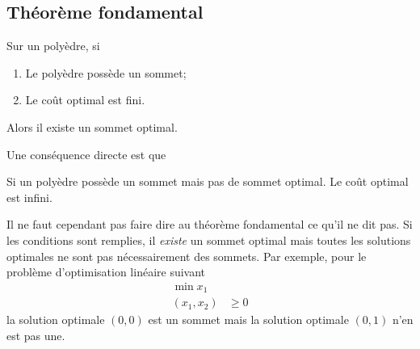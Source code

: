 \subsection{Théorème fondamental}
\begin{mytheo}
  Sur un polyèdre, si
  \begin{enumerate}
    \item Le polyèdre possède un sommet;
    \item Le coût optimal est fini.
  \end{enumerate}
  Alors il existe un sommet optimal.
\end{mytheo}
Une conséquence directe est que
\begin{mycorr}
  Si un polyèdre possède un sommet mais pas de sommet optimal.
  Le coût optimal est infini.
\end{mycorr}
\begin{myrem}
  Il ne faut cependant pas faire dire au
  théorème fondamental ce qu'il ne dit pas.
  Si les conditions sont remplies, il \emph{existe} un sommet optimal mais
  toutes les solutions optimales ne sont pas nécessairement des sommets.
  Par exemple, pour le problème d'optimisation linéaire suivant
  \begin{align*}
    \min x_1\\
    (x_1,x_2) & \geq 0
  \end{align*}
  la solution optimale $(0,0)$ est un sommet mais la solution optimale $(0,1)$
  n'en est pas une.
\end{myrem}


